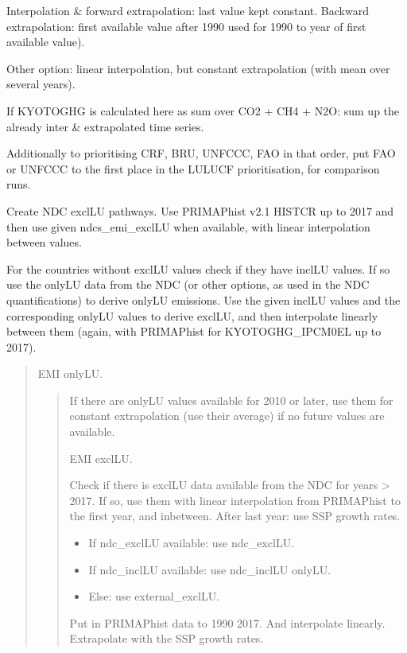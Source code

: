 \documentclass[letterpaper,10pt,english]{sphinxmanual}
\begin{document}
Interpolation \& forward extrapolation: last value kept constant.
Backward extrapolation: first available value after 1990 used for 1990 to year of first available value).

Other option: linear interpolation, but constant extrapolation (with mean over several years).

If KYOTOGHG is calculated here as sum over CO2 + CH4 + N2O: sum up the already inter\sphinxhyphen{} \& extrapolated time series.

Additionally to prioritising CRF, BRU, UNFCCC, FAO in that order, put FAO or UNFCCC to the first place in the LULUCF prioritisation, for comparison runs.

Create NDC exclLU pathways.
Use PRIMAP\sphinxhyphen{}hist v2.1 HISTCR up to 2017 and then use given ndcs\_emi\_exclLU when available, with linear interpolation between values.

For the countries without exclLU values check if they have inclLU values.
If so use the onlyLU data from the NDC (or other options, as used in the NDC quantifications) to derive onlyLU emissions.
Use the given inclLU values and the corresponding onlyLU values to derive exclLU, and then interpolate linearly between them (again, with PRIMAP\sphinxhyphen{}hist for KYOTOGHG\_IPCM0EL up to 2017).
\begin{quote}

EMI onlyLU.
\begin{quote}

If there are onlyLU values available for 2010 or later, use them for constant extrapolation (use their average) if no future values are available.

EMI exclLU.

Check if there is exclLU data available from the NDC for years \textgreater{} 2017.
If so, use them with linear interpolation from PRIMAP\sphinxhyphen{}hist to the first year, and inbetween.
After last year: use SSP growth rates.
\begin{itemize}
\item {} 
If ndc\_exclLU available: use ndc\_exclLU.

\item {} 
If ndc\_inclLU available: use ndc\_inclLU \sphinxhyphen{} onlyLU.

\item {} 
Else: use external\_exclLU.

\end{itemize}

Put in PRIMAP\sphinxhyphen{}hist data to 1990 \sphinxhyphen{} 2017.
And interpolate linearly.
Extrapolate with the SSP growth rates.
\end{quote}
\end{quote}
\end{document}
